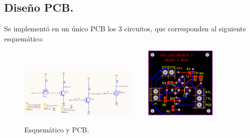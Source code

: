 \subsection{Diseño PCB.}
Se implementó en un único PCB los 3 circuitos, que corresponden al siguiente esquemático:
\begin{figure}[H]	
	\centering
	\includegraphics[width=0.5\textwidth]{Imagenes/Esquematico.PNG} \ \ \ \
	\includegraphics[width=0.3\textwidth]{Imagenes/PCB.PNG}
	\caption{Esquemático y PCB.}
	\label{fig:esquematico}
\end{figure}


